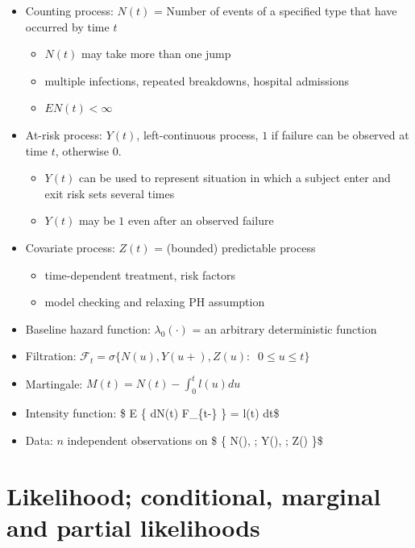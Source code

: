 \documentclass[
]{book}
\providecommand{\tightlist}{%
  \setlength{\itemsep}{0pt}\setlength{\parskip}{0pt}}
\theoremstyle{definition}
\theoremstyle{definition}
\theoremstyle{definition}
\theoremstyle{definition}
\theoremstyle{remark}
\begin{document}
\begin{itemize}
\item
  Counting process: \(N(t)\) = Number of events of a specified type that have occurred by time \(t\)

  \begin{itemize}
  \tightlist
  \item
    \(N(t)\) may take more than one jump
  \item
    multiple infections, repeated breakdowns, hospital admissions
  \item
    \(EN(t) < \infty\)
  \end{itemize}
\item
  At-risk process: \(Y(t)\), left-continuous process, \(1\) if failure can be observed at time \(t\), otherwise \(0\).

  \begin{itemize}
  \tightlist
  \item
    \(Y(t)\) can be used to represent situation in which a subject enter and exit risk sets several times
  \item
    \(Y(t)\) may be \(1\) even after an observed failure
  \end{itemize}
\item
  Covariate process: \(Z(t)\) = (bounded) predictable process

  \begin{itemize}
  \tightlist
  \item
    time-dependent treatment, risk factors
  \item
    model checking and relaxing PH assumption
  \end{itemize}
\item
  Baseline hazard function: \(\lambda_0(\cdot)\) = an arbitrary deterministic function
\item
  Filtration: \(\mathcal F_t = \sigma \Big \{ N(u) , Y(u+) , Z(u): \; \; 0 \le u \le t \Big \}\)
\item
  Martingale: \(M(t) = N(t) - \int_0^t l(u) du\)
\item
  Intensity function: \$ E \Big \{ dN(t) \Big \textbar{} \mathcal F\_\{t-\} \Big\} = l(t) dt\$
\item
  Data: \(n\) independent observations on \$ \Big \{ N(\cdot), ; Y(\cdot), ; Z(\cdot) \Big \}\$
\end{itemize}

\hypertarget{likelihood-conditional-marginal-and-partial-likelihoods}{%
\section{Likelihood; conditional, marginal and partial likelihoods}\label{likelihood-conditional-marginal-and-partial-likelihoods}}
\end{document}
